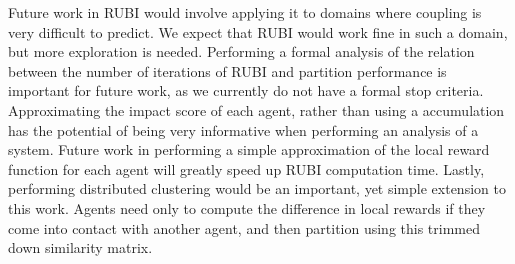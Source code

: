 \documentclass{aamas2014}
\begin{document}
Future work in RUBI would involve applying it to domains where coupling is very difficult to predict. We expect that RUBI would work fine in such a domain, but more exploration is needed. Performing a formal analysis of the relation between the number of iterations of RUBI and partition performance is important for future work, as we currently do not have a formal stop criteria. Approximating the impact score of each agent, rather than using a accumulation has the potential of being very informative when performing an analysis of a system. Future work in performing a simple approximation of the local reward function for each agent will greatly speed up RUBI computation time. Lastly, performing distributed clustering would be an important, yet simple extension to this work. Agents need only to compute the difference in local rewards if they come into contact with another agent, and then partition using this trimmed down similarity matrix. 
\label{sec:CONCLUSION}




\end{document}
